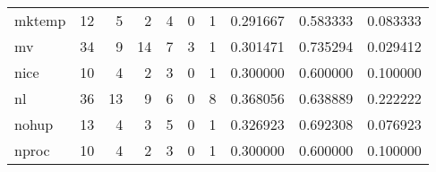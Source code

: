 \begin{tabular}{lrrrrrrrrr}
mktemp    &                                      12 &                                                  5 &                                                  2 &                                                  4 &                                                  0 &                                                  1 &                                           0.291667 &                               0.583333 &                             0.083333 \\
mv        &                                      34 &                                                  9 &                                                 14 &                                                  7 &                                                  3 &                                                  1 &                                           0.301471 &                               0.735294 &                             0.029412 \\
nice      &                                      10 &                                                  4 &                                                  2 &                                                  3 &                                                  0 &                                                  1 &                                           0.300000 &                               0.600000 &                             0.100000 \\
nl        &                                      36 &                                                 13 &                                                  9 &                                                  6 &                                                  0 &                                                  8 &                                           0.368056 &                               0.638889 &                             0.222222 \\
nohup     &                                      13 &                                                  4 &                                                  3 &                                                  5 &                                                  0 &                                                  1 &                                           0.326923 &                               0.692308 &                             0.076923 \\
nproc     &                                      10 &                                                  4 &                                                  2 &                                                  3 &                                                  0 &                                                  1 &                                           0.300000 &                               0.600000 &                             0.100000 \\

\end{tabular}
